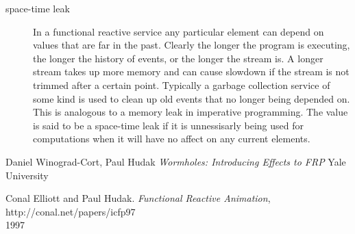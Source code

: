 \documentclass[twocolumn]{paper}
\begin{document}
\begin{description}
\item[space-time leak] In a functional reactive service any particular element can depend on values that are far in the past. Clearly the longer the program is executing, the longer the history of events, or the longer the stream is. A longer stream takes up more memory and can cause slowdown if the stream is not trimmed after a certain point. Typically a garbage collection service of some kind is used to clean up old events that no longer being depended on. This is analogous to a memory leak in imperative programming. The value is said to be a space-time leak if it is unnessisarly being used for computations when it will have no affect on any current elements.
\end{description}

\begin{thebibliography}{9}
    Daniel Winograd-Cort, Paul Hudak
    \emph{Wormholes: Introducing Effects to FRP}
    Yale University
    
    Conal Elliott and Paul Hudak.
    \emph{Functional Reactive Animation},
    http://conal.net/papers/icfp97\\
    1997


\end{thebibliography}
\end{document}

